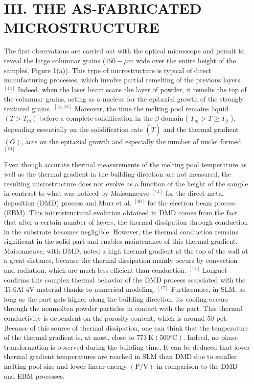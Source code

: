 \documentclass[10pt]{article}
\begin{document}
\section*{III. THE AS-FABRICATED MICROSTRUCTURE}
The first observations are carried out with the optical microscope and permit to reveal the large columnar grains $(150-\mu \mathrm{m}$ wide over the entire height of the samples, Figure 1(a)). This type of microstructure is typical of direct manufacturing processes, which involve partial remelting of the previous layers ${ }^{[14]}$ Indeed, when the laser beam scans the layer of powder, it remelts the top of the columnar grains, acting as a nucleus for the epitaxial growth of the strongly textured grains. ${ }^{[14,15]}$ Moreover, the time the melting pool remains liquid $\left(T>T_{m}\right)$ before a complete solidification in the $\beta$ domain ( $T_{m}>T \geq T_{\beta}$ ), depending essentially on the solidification rate $(\dot{T})$ and the thermal gradient $(G)$, acts on the epitaxial growth and especially the number of nuclei formed. ${ }^{[16]}$

Even though accurate thermal measurements of the melting pool temperature as well as the thermal gradient in the building direction are not measured, the resulting microstructure does not evolve as a function of the height of the sample in contrast to what was noticed by Maisonneuve ${ }^{[14]}$ for the direct metal deposition (DMD) process and Murr et al. ${ }^{[10]}$ for the electron beam process (EBM). This microstructural evolution obtained in DMD comes from the fact that after a certain number of layers, the thermal dissipation through conduction in the substrate becomes negligible. However, the thermal conduction remains significant in the solid part and enables maintenance of this thermal gradient. Maisonneuve, with DMD, noted a high thermal gradient at the top of the wall at a great distance, because the thermal dissipation mainly occurs by convection and radiation, which are much less efficient than conduction. ${ }^{[14]}$ Longuet confirms this complex thermal behavior of the DMD process associated with the Ti-6Al-4V material thanks to numerical modeling. ${ }^{[17]}$ Furthermore, in SLM, as long as the part gets higher along the building direction, its cooling occurs through the nonmolten powder particles in contact with the part. This thermal conductivity is dependent on the porosity content, which is around 50 pct. Because of this source of thermal dissipation, one can think that the temperature of the thermal gradient is, at most, close to $773 \mathrm{~K}\left(500{ }^{\circ} \mathrm{C}\right)$. Indeed, no phase transformation is observed during the building time. It can be deduced that lower thermal gradient temperatures are reached in SLM than DMD due to smaller melting pool size and lower linear energy $(\mathrm{P} / \mathrm{V})$ in comparison to the DMD and EBM processes.
\end{document}

